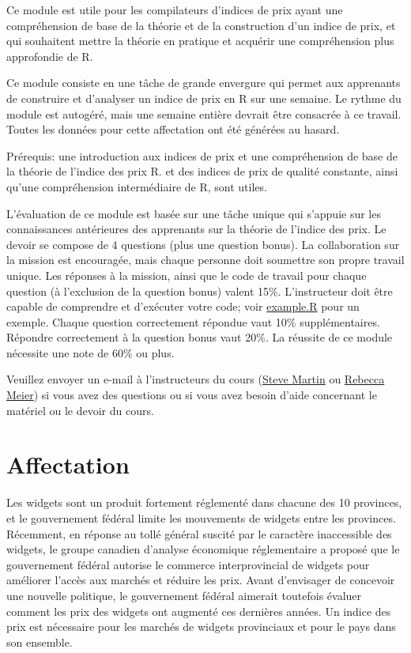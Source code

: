 \documentclass[]{article}
\begin{document}
Ce module est utile pour les compilateurs d'indices de prix ayant une compréhension de base de la théorie et de la construction d'un indice de prix, et qui souhaitent mettre la théorie en pratique et acquérir une compréhension plus approfondie de R.

Ce module consiste en une tâche de grande envergure qui permet aux apprenants de construire et d'analyser un indice de prix en R sur une semaine. Le rythme du module est autogéré, mais une semaine entière devrait être consacrée à ce travail. Toutes les données pour cette affectation ont été générées au hasard.

Prérequis: une introduction aux indices de prix et une compréhension de base de la théorie de l'indice des prix R. et des indices de prix de qualité constante, ainsi qu'une compréhension intermédiaire de R, sont utiles.

L'évaluation de ce module est basée sur une tâche unique qui s'appuie sur les connaissances antérieures des apprenants sur la théorie de l'indice des prix. Le devoir se compose de 4 questions (plus une question bonus). La collaboration sur la mission est encouragée, mais chaque personne doit soumettre son propre travail unique. Les réponses à la mission, ainsi que le code de travail pour chaque question (à l'exclusion de la question bonus) valent 15\%. L'instructeur doit être capable de comprendre et d'exécuter votre code; voir \href{scripts/example.R}{example.R} pour un exemple. Chaque question correctement répondue vaut 10\% supplémentaires. Répondre correctement à la question bonus vaut 20\%. La réussite de ce module nécessite une note de 60\% ou plus.

Veuillez envoyer un e-mail à l'instructeurs du cours (\href{mailto:steve.martin5@canada.ca}{Steve Martin} ou \href{mailto:rebecca.meier@canada.ca}{Rebecca Meier}) si vous avez des questions ou si vous avez besoin d'aide concernant le matériel ou le devoir du cours.

\hypertarget{affectation-3}{%
\section{Affectation}\label{affectation-3}}

Les widgets sont un produit fortement réglementé dans chacune des 10 provinces, et le gouvernement fédéral limite les mouvements de widgets entre les provinces. Récemment, en réponse au tollé général suscité par le caractère inaccessible des widgets, le groupe canadien d'analyse économique réglementaire a proposé que le gouvernement fédéral autorise le commerce interprovincial de widgets pour améliorer l'accès aux marchés et réduire les prix. Avant d'envisager de concevoir une nouvelle politique, le gouvernement fédéral aimerait toutefois évaluer comment les prix des widgets ont augmenté ces dernières années. Un indice des prix est nécessaire pour les marchés de widgets provinciaux et pour le pays dans son ensemble.
\end{document}
